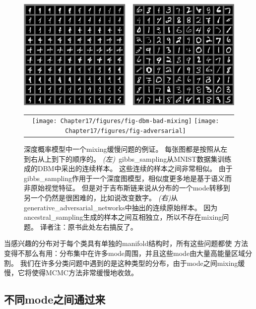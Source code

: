\begin{figure}[!htb]
\ifOpenSource
\centerline{\includegraphics[scale=0.5]{images/153.png}}
\else
    \centering
    \begin{tabular}{cc}
    \texttt{[image: Chapter17/figures/fig-dbm-bad-mixing]}
    \texttt{[image: Chapter17/figures/fig-adversarial]}    
    \end{tabular}
\fi
\caption{深度概率模型中一个\gls{mixing}缓慢问题的例证。
每张图都是按照从左到右从上到下的顺序的。
\emph{(左)}~\gls{gibbs_sampling}从MNIST数据集训练成的\gls{DBM}中采出的连续样本。
这些连续的样本之间非常相似。
由于\,\gls{gibbs_sampling}作用于一个深度图模型，相似度更多地是基于语义而非原始视觉特征。
但是对于吉布斯链来说从分布的一个\gls{mode}转移到另一个仍然是很困难的，比如说改变数字。
\emph{(右)}从\gls{generative_adversarial_networks}中抽出的连续原始样本。
因为\gls{ancestral_sampling}生成的样本之间互相独立，所以不存在\gls{mixing}问题。
{译者注：原书此处左右搞反了。}} 
\label{fig:chap17_fig-dbm-bad-mixing}
\end{figure}


当感兴趣的分布对于每个类具有单独的\gls{manifold}结构时，所有这些问题都使\,\,方法变得不那么有用：分布集中在许多\gls{mode}周围，并且这些\gls{mode}由大量高能量区域分割。
我们在许多分类问题中遇到的是这种类型的分布，由于\gls{mode}之间\gls{mixing}缓慢，它将使得MCMC方法非常缓慢地收敛。



\subsection{不同\gls{mode}之间通过来}
\label{sec:tempering_to_mix_between_modes}

